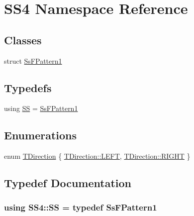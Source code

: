 \hypertarget{namespaceSS4}{}\section{S\+S4 Namespace Reference}
\label{namespaceSS4}
\subsection*{Classes}
\begin{DoxyCompactItemize}
\item 
struct \hyperlink{structSS4_1_1SsFPattern1}{Ss\+F\+Pattern1}
\end{DoxyCompactItemize}
\subsection*{Typedefs}
\begin{DoxyCompactItemize}
\item 
using \hyperlink{namespaceSS4_aaab5c7b089278bc35c300af25ddf5999}{SS} = \hyperlink{structSS4_1_1SsFPattern1}{Ss\+F\+Pattern1}
\end{DoxyCompactItemize}
\subsection*{Enumerations}
\begin{DoxyCompactItemize}
\item 
enum \hyperlink{namespaceSS4_ac7fa695c4f9dc0b99e73fcbbf5311282}{T\+Direction} \{ \hyperlink{namespaceSS4_ac7fa695c4f9dc0b99e73fcbbf5311282a684d325a7303f52e64011467ff5c5758}{T\+Direction\+::\+L\+E\+FT}, 
\hyperlink{namespaceSS4_ac7fa695c4f9dc0b99e73fcbbf5311282a21507b40c80068eda19865706fdc2403}{T\+Direction\+::\+R\+I\+G\+HT}
 \}
\end{DoxyCompactItemize}


\subsection{Typedef Documentation}
\subsubsection[{\texorpdfstring{SS}{SS}}]{\setlength{\rightskip}{0pt plus 5cm}using {\bf S\+S4\+::\+SS} = typedef {\bf Ss\+F\+Pattern1}}\hypertarget{namespaceSS4_aaab5c7b089278bc35c300af25ddf5999}{}\label{namespaceSS4_aaab5c7b089278bc35c300af25ddf5999}


